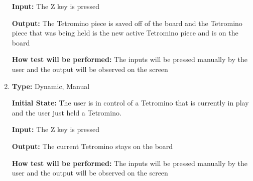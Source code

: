 \documentclass[12pt, titlepage]{article}
\begin{document}
\begin{enumerate}[{FR-CI-}1. ]
		\textbf{Input:} The Z key is pressed 
		
		\textbf{Output:} The Tetromino piece is saved off of the board and the Tetromino piece that was being held is the new active Tetromino piece and is on the board 
		
		\textbf{How test will be performed:} The inputs will be pressed manually by the user and the output will be observed on the screen
		
		\item
		\textbf{Type:} Dynamic, Manual
		
		\textbf{Initial State:} The user is in control of a Tetromino that is currently in play and the user just held a Tetromino.
		
		\textbf{Input:} The Z key is pressed 
		
		\textbf{Output:} The current Tetromino stays on the board
		
		\textbf{How test will be performed:} The inputs will be pressed manually by the user and the output will be observed on the screen
	\end{enumerate}
	
\end{document}
